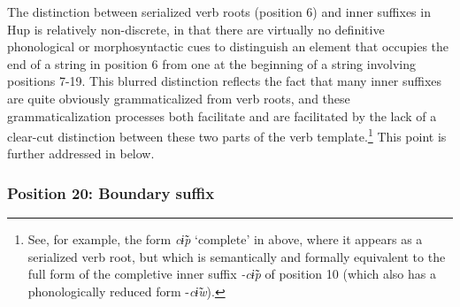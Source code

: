 \documentclass[output=paper]{langscibook}
\begin{document}
The distinction between serialized verb roots (position 6) and inner suffixes in Hup is relatively non-discrete, in that there are virtually no definitive phonological or morphosyntactic cues to distinguish an element that occupies the end of a string in position 6 from one at the beginning of a string involving positions 7-19. This blurred distinction reflects the fact that many inner suffixes are quite obviously grammaticalized from verb roots, and these grammaticalization processes both facilitate and are facilitated by the lack of a clear-cut distinction between these two parts of the verb template.\footnote{See, for example, the form \textit{cɨ̃p} `complete' in   above, where it appears as a serialized verb root, but which is semantically and formally equivalent to the full form of the completive inner suffix \textit{{}-cɨ̃p} of position 10 (which also has a phonologically reduced form -\textit{cɨ̃w}).} This point is further addressed in  below.

\subsubsection{Position 20: Boundary suffix} \label{sec:hup:key:3.1.4}%
\end{document}
